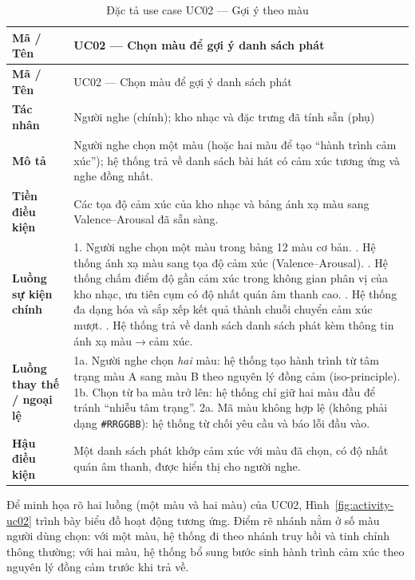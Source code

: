 \documentclass[../DoAn.tex]{subfiles}
\begin{document}
\begin{longtable}{|p{3.0cm}|p{11.0cm}|}
\caption{Đặc tả use case UC02 --- Gợi ý theo màu}\label{table:uc02}\\
\hline
\textbf{Mã / Tên} & UC02 --- Chọn màu để gợi ý danh sách phát \\
\hline
\endfirsthead
\hline
\textbf{Mã / Tên} & UC02 --- Chọn màu để gợi ý danh sách phát \\
\hline
\endhead
\textbf{Tác nhân} & Người nghe (chính); kho nhạc và đặc trưng đã tính sẵn (phụ) \\ \hline
\textbf{Mô tả} & Người nghe chọn một màu (hoặc hai màu để tạo ``hành trình cảm xúc''); hệ thống trả về danh sách bài hát có cảm xúc tương ứng và nghe đồng nhất. \\ \hline
\textbf{Tiền điều kiện} & Các tọa độ cảm xúc của kho nhạc và bảng ánh xạ màu sang Valence--Arousal đã sẵn sàng. \\ \hline
\textbf{Luồng sự kiện chính} & 1. Người nghe chọn một màu trong bảng 12 màu cơ bản. \newline 2. Hệ thống ánh xạ màu sang tọa độ cảm xúc (Valence--Arousal). \newline 3. Hệ thống chấm điểm độ gần cảm xúc trong không gian phân vị của kho nhạc, ưu tiên cụm có độ nhất quán âm thanh cao. \newline 4. Hệ thống đa dạng hóa và sắp xếp kết quả thành chuỗi chuyển cảm xúc mượt. \newline 5. Hệ thống trả về danh sách danh sách phát kèm thông tin ánh xạ màu$\rightarrow$cảm xúc. \\ \hline
\textbf{Luồng thay thế / ngoại lệ} & 1a. Người nghe chọn \textit{hai} màu: hệ thống tạo hành trình từ tâm trạng màu A sang màu B theo nguyên lý đồng cảm (iso-principle). \newline 1b. Chọn từ ba màu trở lên: hệ thống chỉ giữ hai màu đầu để tránh ``nhiễu tâm trạng''. \newline 2a. Mã màu không hợp lệ (không phải dạng \texttt{\#RRGGBB}): hệ thống từ chối yêu cầu và báo lỗi đầu vào. \\ \hline
\textbf{Hậu điều kiện} & Một danh sách phát khớp cảm xúc với màu đã chọn, có độ nhất quán âm thanh, được hiển thị cho người nghe. \\ \hline
\end{longtable}

Để minh họa rõ hai luồng (một màu và hai màu) của UC02, Hình~\ref{fig:activity-uc02} trình bày biểu đồ hoạt động tương ứng. Điểm rẽ nhánh nằm ở số màu người dùng chọn: với một màu, hệ thống đi theo nhánh truy hồi và tinh chỉnh thông thường; với hai màu, hệ thống bổ sung bước sinh hành trình cảm xúc theo nguyên lý đồng cảm trước khi trả về.
\end{document}
